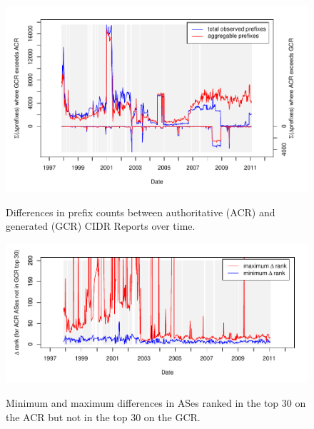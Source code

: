 \begin{figure}
\begin{centering}
    \includegraphics[width=6in]{figures/cidr_report_validity_prefix_error.pdf}
    \vspace{-2em}\\
    \caption{Differences in prefix counts between authoritative (ACR) and generated (GCR) CIDR Reports over time.}
\end{centering}
\end{figure}

\begin{figure}
\begin{centering}
    \includegraphics[width=6in]{figures/cidr_report_validity_rank_error.pdf}
    \vspace{-2em}\\
    \caption{Minimum and maximum differences in ASes ranked in the top 30 on the ACR but not in the top 30 on the GCR.}
\end{centering}
\end{figure}

